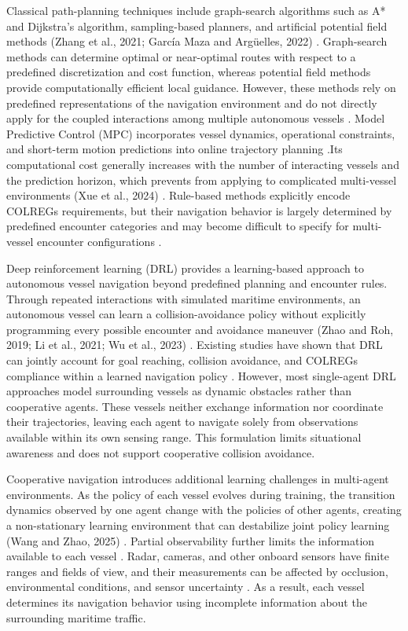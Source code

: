 \documentclass[final,5p,times,twocolumn]{elsarticle}
\begin{document}
{Classical path-planning techniques include graph-search algorithms such as A* and Dijkstra's algorithm, sampling-based planners, and artificial potential field methods (Zhang et al., 2021; García Maza and Argüelles, 2022) \cite{8}. Graph-search methods can determine optimal or near-optimal routes with respect to a predefined discretization and cost function, whereas potential field methods provide computationally efficient local guidance.
However, these methods rely on predefined representations of the navigation environment and do not directly apply for the coupled interactions among multiple autonomous vessels \cite{10}. Model Predictive Control (MPC) incorporates vessel dynamics, operational constraints, and short-term motion predictions into online trajectory planning \cite{11}.Its computational cost generally increases with the number of interacting vessels and the prediction horizon, which prevents from applying to complicated multi-vessel environments (Xue et al., 2024) \cite{12}. Rule-based methods explicitly encode COLREGs requirements, but their navigation behavior is largely determined by predefined encounter categories and may become difficult to specify for multi-vessel encounter configurations \cite{13}.

Deep reinforcement learning (DRL) provides a learning-based approach to autonomous vessel navigation beyond predefined planning and encounter rules. Through repeated interactions with simulated maritime environments, an autonomous vessel can learn a collision-avoidance policy without explicitly programming every possible encounter and avoidance maneuver (Zhao and Roh, 2019; Li et al., 2021; Wu et al., 2023) \cite{16,17,18}. Existing studies have shown that DRL can jointly account for goal reaching, collision avoidance, and COLREGs compliance within a learned navigation policy \cite{19} \cite{20}. However, most single-agent DRL approaches model surrounding vessels as dynamic obstacles rather than cooperative agents. These vessels neither exchange information nor coordinate their trajectories, leaving each agent to navigate solely from observations available within its own sensing range. This formulation limits situational awareness and does not support cooperative collision avoidance.

Cooperative navigation introduces additional learning challenges in multi-agent environments. As the policy of each vessel evolves during training, the transition dynamics observed by one agent change with the policies of other agents, creating a non-stationary learning environment that can destabilize joint policy learning (Wang and Zhao, 2025) \cite{21}. Partial observability further limits the information available to each vessel \cite{22}. Radar, cameras, and other onboard sensors have finite ranges and fields of view, and their measurements can be affected by occlusion, environmental conditions, and sensor uncertainty \cite{23} \cite{24}. As a result, each vessel determines its navigation behavior using incomplete information about the surrounding maritime traffic.

}
\end{document}
